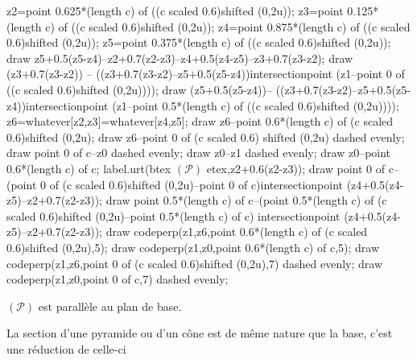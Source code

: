 \begin{propriete}
\begin{center}
{\begin{Geometrie}[CoinBG={(-6u,-2u)},CoinHD={(6u,6u)}]
                z2=point 0.625*(length c) of ((c scaled 0.6)shifted (0,2u));
                z3=point 0.125*(length c) of ((c scaled 0.6)shifted (0,2u));
                z4=point 0.875*(length c) of ((c scaled 0.6)shifted (0,2u));
                z5=point 0.375*(length c) of ((c scaled 0.6)shifted (0,2u));
                draw z5+0.5(z5-z4)--z2+0.7(z2-z3)--z4+0.5(z4-z5)--z3+0.7(z3-z2);
                draw (z3+0.7(z3-z2)) -- ((z3+0.7(z3-z2)--z5+0.5(z5-z4))intersectionpoint (z1--point 0 of ((c scaled 0.6)shifted (0,2u))));
                draw (z5+0.5(z5-z4))-- ((z3+0.7(z3-z2)--z5+0.5(z5-z4))intersectionpoint (z1--point 0.5*(length c) of ((c scaled 0.6)shifted (0,2u))));
                z6=whatever[z2,z3]=whatever[z4,z5];
                draw z6--point 0.6*(length c) of (c scaled 0.6)shifted (0,2u);
                draw z6--point 0 of (c scaled 0.6) shifted (0,2u) dashed evenly;
                draw point 0 of c--z0 dashed evenly;
                draw z0--z1 dashed evenly;
                draw z0--point 0.6*(length c) of c;
                label.urt(btex $(\mathcal P)$ etex,z2+0.6(z2-z3));
                draw point 0 of c--(point 0 of (c scaled 0.6)shifted (0,2u)--point 0 of c)intersectionpoint (z4+0.5(z4-z5)--z2+0.7(z2-z3));
                draw point 0.5*(length c) of c--(point 0.5*(length c) of (c scaled 0.6)shifted (0,2u)--point 0.5*(length c) of c) intersectionpoint (z4+0.5(z4-z5)--z2+0.7(z2-z3));
                draw codeperp(z1,z6,point 0.6*(length c) of (c scaled 0.6)shifted (0,2u),5);
                draw codeperp(z1,z0,point 0.6*(length c) of c,5);
                draw codeperp(z1,z6,point 0 of (c scaled 0.6)shifted (0,2u),7) dashed evenly;
                draw codeperp(z1,z0,point 0 of c,7) dashed evenly;
            \end{Geometrie}
        }
        \hfill\phantom{rrr}

        $(\mathcal{P})$ est parallèle au plan de base.
    \end{center}
    \smallskip
    La section d'une pyramide ou d'un cône est de même nature que la base, c'est une réduction de celle-ci
\end{propriete}

